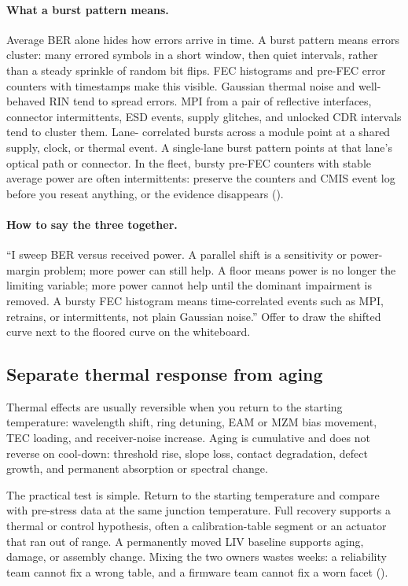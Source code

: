 \paragraph{What a burst pattern means.}
Average BER alone hides how errors arrive in time. A burst pattern means
errors cluster: many errored symbols in a short window, then quiet intervals,
rather than a steady sprinkle of random bit flips. FEC
histograms and pre-FEC error counters with timestamps make this visible.
Gaussian thermal noise and well-behaved RIN tend to spread errors. MPI from a
pair of reflective interfaces, connector intermittents, ESD events, supply
glitches, and unlocked CDR intervals tend to cluster them. Lane-
correlated bursts across a module point at a shared supply, clock, or thermal
event. A single-lane burst pattern points at that lane's optical path or
connector. In the fleet, bursty pre-FEC counters with stable average power are
often intermittents: preserve the counters and CMIS event log
before you reseat anything, or the evidence disappears
().

\paragraph{How to say the three together.}
``I sweep BER versus received power. A parallel shift is a sensitivity or
power-margin problem; more power can still help. A floor means power is no
longer the limiting variable; more power cannot help until the dominant
impairment is removed. A bursty FEC histogram means time-correlated events
such as MPI, retrains, or intermittents, not plain Gaussian noise.'' Offer
to draw the shifted curve next to the floored curve on the whiteboard.

\subsection{Separate thermal response from aging}

Thermal effects are usually reversible when you return to the starting
temperature: wavelength shift, ring detuning, EAM or
MZM bias movement, TEC loading, and
receiver-noise increase. Aging is cumulative and does not reverse on
cool-down: threshold rise, slope loss, contact degradation, defect growth,
and permanent absorption or spectral change.

The practical test is simple. Return to the starting temperature and compare
with pre-stress data at the same junction temperature. Full recovery supports
a thermal or control hypothesis, often a calibration-table segment or an
actuator that ran out of range. A permanently moved LIV
baseline supports aging, damage, or assembly change. Mixing the two owners
wastes weeks: a reliability team cannot fix a wrong table, and a firmware
team cannot fix a worn facet ().

